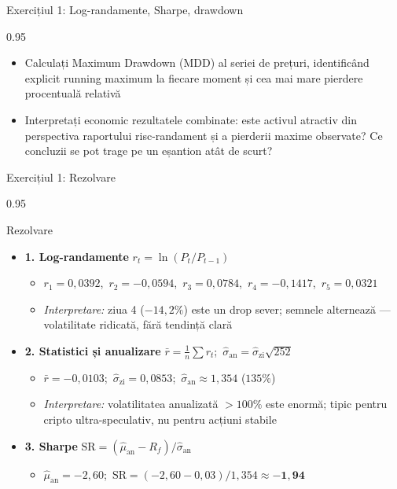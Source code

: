 \documentclass[9pt, aspectratio=169, t]{beamer}
\begin{document}
\begin{frame}[shrink=25]{Exercițiul 1: Log-randamente, Sharpe, drawdown}
\begin{cminipage}{0.95\textwidth}
\begin{itemize}
\begin{itemize}
        \item Calculați Maximum Drawdown (MDD) al seriei de prețuri, identificând explicit running maximum la fiecare moment și cea mai mare pierdere procentuală relativă
        \item Interpretați economic rezultatele combinate: este activul atractiv din perspectiva raportului risc-randament și a pierderii maxime observate? Ce concluzii se pot trage pe un eșantion atât de scurt?
    \end{itemize}
\end{itemize}
\end{cminipage}
\end{frame}

\begin{frame}[shrink=25]{Exercițiul 1: Rezolvare}
\begin{cminipage}{0.95\textwidth}
\begin{exampleblock}{Rezolvare}
\small
\begin{itemize}\setlength{\itemsep}{0pt}
    \item \textbf{1. Log-randamente} \quad $r_t = \ln(P_t/P_{t-1})$
    \begin{itemize}\setlength{\itemsep}{0pt}
        \item $r_1 = 0{,}0392$,\ $r_2 = -0{,}0594$,\ $r_3 = 0{,}0784$,\ $r_4 = -0{,}1417$,\ $r_5 = 0{,}0321$
        \item \textit{Interpretare:} ziua 4 ($-14{,}2\%$) este un drop sever; semnele alternează --- volatilitate ridicată, fără tendință clară
    \end{itemize}
    \item \textbf{2. Statistici și anualizare} \quad $\bar r = \frac{1}{n}\sum r_t$;\ $\hat\sigma_{\text{an}} = \hat\sigma_{\text{zi}}\sqrt{252}$
    \begin{itemize}\setlength{\itemsep}{0pt}
        \item $\bar{r} = -0{,}0103$;\ $\hat{\sigma}_{\text{zi}} = 0{,}0853$;\ $\hat{\sigma}_{\text{an}} \approx 1{,}354$ ($135\%$)
        \item \textit{Interpretare:} volatilitatea anualizată $> 100\%$ este enormă; tipic pentru cripto ultra-speculativ, nu pentru acțiuni stabile
    \end{itemize}
    \item \textbf{3. Sharpe} \quad $\text{SR} = (\hat\mu_{\text{an}} - R_f) / \hat\sigma_{\text{an}}$
    \begin{itemize}\setlength{\itemsep}{0pt}
        \item $\hat{\mu}_{\text{an}} = -2{,}60$;\ $\text{SR} = (-2{,}60 - 0{,}03)/1{,}354 \approx \mathbf{-1{,}94}$

\end{itemize}
\end{itemize}
\end{exampleblock}
\end{cminipage}
\end{frame}
\end{document}
